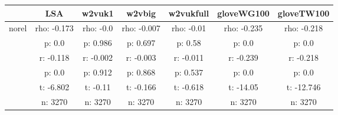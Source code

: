 \documentclass{article}
\begin{document}
\begin{tabular}{ccccccc|}\cline{2-7}
&\multicolumn{1}{|c}{LSA} & w2vuk1 & w2vbig & w2vukfull & gloveWG100 & gloveTW100 \\\hline
\multicolumn{1}{|c|}{\multirow{6}{*}{norel}} & rho: -0.173 & rho: -0.0 & rho: -0.007 & rho: -0.01 & rho: -0.235 & rho: -0.218 \\
\multicolumn{1}{|c|}{} & p: 0.0 & p: 0.986 & p: 0.697 & p: 0.58 & p: 0.0 & p: 0.0 \\
\multicolumn{1}{|c|}{} & r: -0.118 & r: -0.002 & r: -0.003 & r: -0.011 & r: -0.239 & r: -0.218 \\
\multicolumn{1}{|c|}{} & p: 0.0 & p: 0.912 & p: 0.868 & p: 0.537 & p: 0.0 & p: 0.0 \\
\multicolumn{1}{|c|}{} & t: -6.802 & t: -0.11 & t: -0.166 & t: -0.618 & t: -14.05 & t: -12.746 \\
\multicolumn{1}{|c|}{} & n: 3270 & n: 3270 & n: 3270 & n: 3270 & n: 3270 & n: 3270 \\
\hline
\end{tabular}\\
\end{document}
